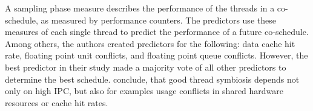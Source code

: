 A sampling phase measure describes the performance of the threads in a
co-schedule, as measured by performance counters.
The predictors use these measures of each single thread to predict the
performance of a future co-schedule.
Among others, the authors created predictors for the following:
data cache hit rate, floating point unit conflicts, and floating point queue
conflicts.
However, the best predictor in their study made a majority vote of all other
predictors to determine the best schedule.
\citeauthor{snavely_symbiotic_2000} conclude, that good thread symbiosis depends
not only on high IPC, but also for examples usage conflicts in shared hardware
resources or cache hit rates.
\\

\begin{comment}
In \citeyear{snavely_symbiotic_2002} \citeauthor{snavely_symbiotic_2002}
discuss the topic of priorities in symbiotic schedules.
In their earlier work (\cite{snavely_symbiotic_2000}) they assume same
priority jobs.
Now, they present two meanings for priority: ``(A) guarantee a fraction of
machine proportional to priority'' or ``(B) guarantee a fraction of
single-threaded performance proportional to priority''
(\autocite[70]{snavely_symbiotic_2002}).
The authors base their priority mechanisms on two values: SOLOFRAC and CS.
SOLOFRAC is the, from the priority derived fraction of the CPU time,
a job needs to be scheduled alone and CS is the fraction of the CPU time,
where no job is solo scheduled.

The 'Naive' priority mechanism schedules a job alone for its SOLOFRAC
share and co-schedules for CS cycles. Behind this stand two assumptions: first,
during co-scheduling each job is an equal share of the cycles assigned.
And second, the number of jobs does not exceed the number of \gls{smt}-cores.

The proposed 'Symb' mechanism on the other hand, can handle more jobs
than available \gls{smt}-cores and observes job behaviour. By running jobs
solo, 'Symb' determines the job's ``'natural' IPC''
(\autocite[71]{snavely_symbiotic_2002})
and then evaluates the job's performance during a phase of co-scheduling.
Based on this measurement, the SOLOFRAC portion is reduced such that the job get its
rightful share of cycles. The increase in co-scheduling time leads to increased
utilization of the system.

Other presented approaches in \cite{snavely_symbiotic_2002} require hardware
changes and are therefore out of scope.
\\
\end{comment}

